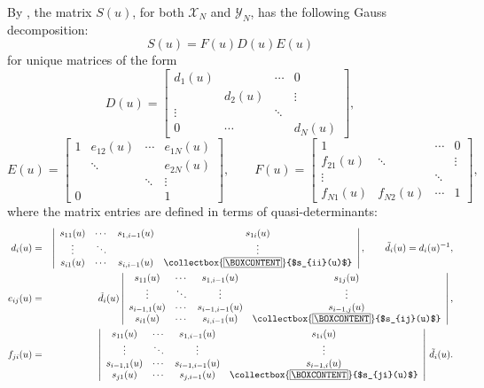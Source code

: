\documentclass[11pt,reqno]{amsart}
\newcommand{\mybox}{%
    \collectbox{%
        \setlength{\fboxsep}{1pt}%
        \fbox{\BOXCONTENT}%
    }%
}
\numberwithin{equation}{section}
\theoremstyle{definition}
\theoremstyle{remark}
\newcommand{\tl}{\tilde}
\newcommand{\Y}{{\mathscr{Y}}}
\newcommand{\scrX}{{\mathscr{X}}}
\begin{document}
By \cite[Thm. 4.96]{GGRW:2005}, the matrix $S(u)$, for both $\scrX_N$ and $\Y_N$, has the following Gauss decomposition:
$$
S(u) = F(u) D(u) E(u)
$$
for unique matrices of the form
\begin{equation*}
D(u) = \left[ \begin{array}{cccc} d_1 (u) & &\cdots & 0\\
& d_2 (u) &  &\vdots\ \\
\vdots & &\ddots &\\
0 &\cdots &  &d_{N} (u)
\end{array} \right],
\end{equation*}
\begin{equation*}
E(u)=\left[ \begin{array}{cccc} \!\!1 &e_{12}(u) &\cdots & e_{1N}(u)\!\!  \\
&\ddots & &e_{2N}(u) \!\! \\
& &\ddots & \vdots\\
0 & & &1 
\end{array} \right],\qquad 
F(u) = \left[ \begin{array}{cccc} \!\!1 & &\cdots &0\!\!\\
f_{21}(u) &\ddots & &\vdots\\
\vdots & & \ddots& \\
\!\!f_{N1}(u) & f_{N2}(u) &\cdots &1\!
\end{array} \right],
\end{equation*}
where the matrix entries are defined in terms of quasi-determinants:
\begin{eqnarray}
d_i (u) &=& \left\vert  \begin{array}{cccc} s_{11}(u) &\cdots &s_{1,i-1}(u) &s_{1i}(u) \\
\vdots &\ddots & &\vdots \\
s_{i1}(u) &\cdots &s_{i,i-1}(u) &\mybox{$s_{ii}(u)$}
\end{array} \right\vert, 
\qquad \tl d_i(u)=d_i(u)^{-1}, \label{gd1}
\\
e_{ij}(u) &=&\tl d_i (u) \left\vert  \begin{array}{cccc} s_{11}(u) &\cdots & s_{1,i-1}(u) & s_{1j}(u) \\
\vdots &\ddots &\vdots & \vdots \\
s_{i-1,1}(u) &\cdots &s_{i-1,i-1}(u) & s_{i-1,j}(u)\\
s_{i1}(u) &\cdots &s_{i,i-1}(u) &\mybox{$s_{ij}(u)$}
\end{array} \right\vert,\label{gd2}
\\
f_{ji}(u) &=& \left\vert  \begin{array}{cccc} s_{11}(u) &\cdots &s_{1, i-1}(u) & s_{1i}(u) \\
\vdots &\ddots &\vdots &\vdots \\
s_{i-1,1}(u) &\cdots &s_{i-1,i-1}(u) &s_{i-1,i}(u)\\
s_{j1}(u) &\cdots &s_{j, i-1}(u) &\mybox{$s_{ji}(u)$} 
\end{array} \right\vert\, 
\tl d_{i}(u).\label{gd3}
\end{eqnarray}
\end{document}
